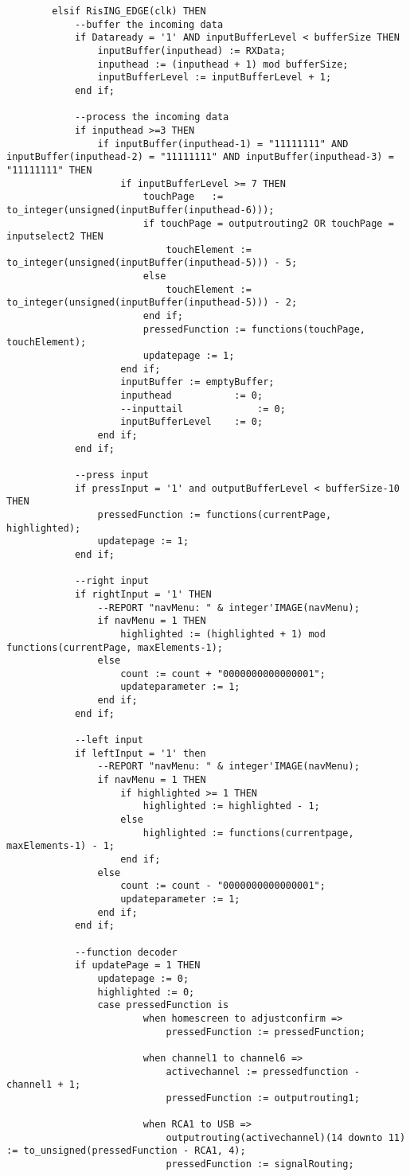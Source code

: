 \begin{lstlisting}
		elsif RisING_EDGE(clk) THEN
			--buffer the incoming data
			if Dataready = '1' AND inputBufferLevel < bufferSize THEN
				inputBuffer(inputhead) := RXData;
				inputhead := (inputhead + 1) mod bufferSize;
				inputBufferLevel := inputBufferLevel + 1;
			end if;
			
			--process the incoming data
			if inputhead >=3 THEN
				if inputBuffer(inputhead-1) = "11111111" AND inputBuffer(inputhead-2) = "11111111" AND inputBuffer(inputhead-3) = "11111111" THEN
					if inputBufferLevel >= 7 THEN
						touchPage 	:= to_integer(unsigned(inputBuffer(inputhead-6)));
						if touchPage = outputrouting2 OR touchPage = inputselect2 THEN
							touchElement := to_integer(unsigned(inputBuffer(inputhead-5))) - 5;
						else
							touchElement := to_integer(unsigned(inputBuffer(inputhead-5))) - 2;
						end if;
						pressedFunction := functions(touchPage, touchElement);
						updatepage := 1;
					end if;
					inputBuffer := emptyBuffer;
					inputhead 			:= 0;
					--inputtail 			:= 0;
					inputBufferLevel 	:= 0;
				end if;
			end if;
			
			--press input
			if pressInput = '1' and outputBufferLevel < bufferSize-10 THEN
				pressedFunction := functions(currentPage, highlighted);
				updatepage := 1;
			end if;
			
			--right input
			if rightInput = '1' THEN
				--REPORT "navMenu: " & integer'IMAGE(navMenu);
				if navMenu = 1 THEN
					highlighted := (highlighted + 1) mod functions(currentPage, maxElements-1);
				else
					count := count + "0000000000000001";
					updateparameter := 1;
				end if;
			end if;
			
			--left input
			if leftInput = '1' then
				--REPORT "navMenu: " & integer'IMAGE(navMenu);
				if navMenu = 1 THEN
					if highlighted >= 1 THEN
						highlighted := highlighted - 1;
					else
						highlighted := functions(currentpage, maxElements-1) - 1;
					end if;
				else
					count := count - "0000000000000001";
					updateparameter := 1;
				end if;
			end if;
			
			--function decoder
			if updatePage = 1 THEN
				updatepage := 0;
				highlighted := 0;
				case pressedFunction is
						when homescreen to adjustconfirm => 
							pressedFunction := pressedFunction;

						when channel1 to channel6 => 
							activechannel := pressedfunction - channel1 + 1;
							pressedFunction := outputrouting1;
							
						when RCA1 to USB => 
							outputrouting(activechannel)(14 downto 11) := to_unsigned(pressedFunction - RCA1, 4);
							pressedFunction := signalRouting;


\end{lstlisting}
